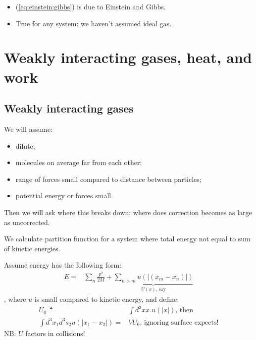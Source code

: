 \documentclass[]{article}
\begin{document}
\begin{itemize}
	\item (\ref{eq:einstein:gibbs}) is due to Einstein and Gibbs.
	\item True for any system: we haven't assumed ideal gas.
\end{itemize}


\section{Weakly interacting gases, heat, and work}


\subsection{Weakly interacting gases}

We will assume:
\begin{itemize}
	\item dilute;
	\item molecules on average far from each other;
	\item range of forces small compared to distance between particles;
	\item potential energy or forces small.
\end{itemize}

Then we will ask where this breaks down; where does correction becomes as large as uncorrected. 

We calculate partition function for a system where total energy not equal to sum of kinetic energies.

Assume energy has the following form:
\begin{align*}
E =& \sum_{n} \frac{p^2}{2M} + \underbrace{\sum_{n>m}u(\vert(x_m-x_n)\vert)}_{U(x)\text{, say}}
\end{align*}
, where $u$ is small compared to kinetic energy, and define:
\begin{align*}
U_0 \triangleq& \int d^3x x.u(\vert x \vert)\text{, then}\\
\int d^3x_1 d^3s_2 u(\vert x_1 - x_2\vert) = & V U_0\text{, ignoring surface expects!}
\end{align*}
NB: $U$ factors in collisions!
\end{document}

